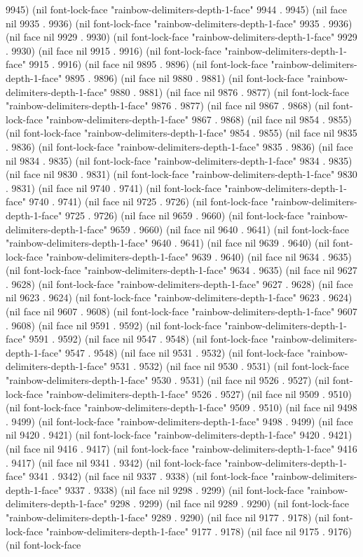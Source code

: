 9945) (nil font-lock-face "rainbow-delimiters-depth-1-face" 9944 . 9945) (nil face nil 9935 . 9936) (nil font-lock-face "rainbow-delimiters-depth-1-face" 9935 . 9936) (nil face nil 9929 . 9930) (nil font-lock-face "rainbow-delimiters-depth-1-face" 9929 . 9930) (nil face nil 9915 . 9916) (nil font-lock-face "rainbow-delimiters-depth-1-face" 9915 . 9916) (nil face nil 9895 . 9896) (nil font-lock-face "rainbow-delimiters-depth-1-face" 9895 . 9896) (nil face nil 9880 . 9881) (nil font-lock-face "rainbow-delimiters-depth-1-face" 9880 . 9881) (nil face nil 9876 . 9877) (nil font-lock-face "rainbow-delimiters-depth-1-face" 9876 . 9877) (nil face nil 9867 . 9868) (nil font-lock-face "rainbow-delimiters-depth-1-face" 9867 . 9868) (nil face nil 9854 . 9855) (nil font-lock-face "rainbow-delimiters-depth-1-face" 9854 . 9855) (nil face nil 9835 . 9836) (nil font-lock-face "rainbow-delimiters-depth-1-face" 9835 . 9836) (nil face nil 9834 . 9835) (nil font-lock-face "rainbow-delimiters-depth-1-face" 9834 . 9835) (nil face nil 9830 . 9831) (nil font-lock-face "rainbow-delimiters-depth-1-face" 9830 . 9831) (nil face nil 9740 . 9741) (nil font-lock-face "rainbow-delimiters-depth-1-face" 9740 . 9741) (nil face nil 9725 . 9726) (nil font-lock-face "rainbow-delimiters-depth-1-face" 9725 . 9726) (nil face nil 9659 . 9660) (nil font-lock-face "rainbow-delimiters-depth-1-face" 9659 . 9660) (nil face nil 9640 . 9641) (nil font-lock-face "rainbow-delimiters-depth-1-face" 9640 . 9641) (nil face nil 9639 . 9640) (nil font-lock-face "rainbow-delimiters-depth-1-face" 9639 . 9640) (nil face nil 9634 . 9635) (nil font-lock-face "rainbow-delimiters-depth-1-face" 9634 . 9635) (nil face nil 9627 . 9628) (nil font-lock-face "rainbow-delimiters-depth-1-face" 9627 . 9628) (nil face nil 9623 . 9624) (nil font-lock-face "rainbow-delimiters-depth-1-face" 9623 . 9624) (nil face nil 9607 . 9608) (nil font-lock-face "rainbow-delimiters-depth-1-face" 9607 . 9608) (nil face nil 9591 . 9592) (nil font-lock-face "rainbow-delimiters-depth-1-face" 9591 . 9592) (nil face nil 9547 . 9548) (nil font-lock-face "rainbow-delimiters-depth-1-face" 9547 . 9548) (nil face nil 9531 . 9532) (nil font-lock-face "rainbow-delimiters-depth-1-face" 9531 . 9532) (nil face nil 9530 . 9531) (nil font-lock-face "rainbow-delimiters-depth-1-face" 9530 . 9531) (nil face nil 9526 . 9527) (nil font-lock-face "rainbow-delimiters-depth-1-face" 9526 . 9527) (nil face nil 9509 . 9510) (nil font-lock-face "rainbow-delimiters-depth-1-face" 9509 . 9510) (nil face nil 9498 . 9499) (nil font-lock-face "rainbow-delimiters-depth-1-face" 9498 . 9499) (nil face nil 9420 . 9421) (nil font-lock-face "rainbow-delimiters-depth-1-face" 9420 . 9421) (nil face nil 9416 . 9417) (nil font-lock-face "rainbow-delimiters-depth-1-face" 9416 . 9417) (nil face nil 9341 . 9342) (nil font-lock-face "rainbow-delimiters-depth-1-face" 9341 . 9342) (nil face nil 9337 . 9338) (nil font-lock-face "rainbow-delimiters-depth-1-face" 9337 . 9338) (nil face nil 9298 . 9299) (nil font-lock-face "rainbow-delimiters-depth-1-face" 9298 . 9299) (nil face nil 9289 . 9290) (nil font-lock-face "rainbow-delimiters-depth-1-face" 9289 . 9290) (nil face nil 9177 . 9178) (nil font-lock-face "rainbow-delimiters-depth-1-face" 9177 . 9178) (nil face nil 9175 . 9176) (nil font-lock-face 